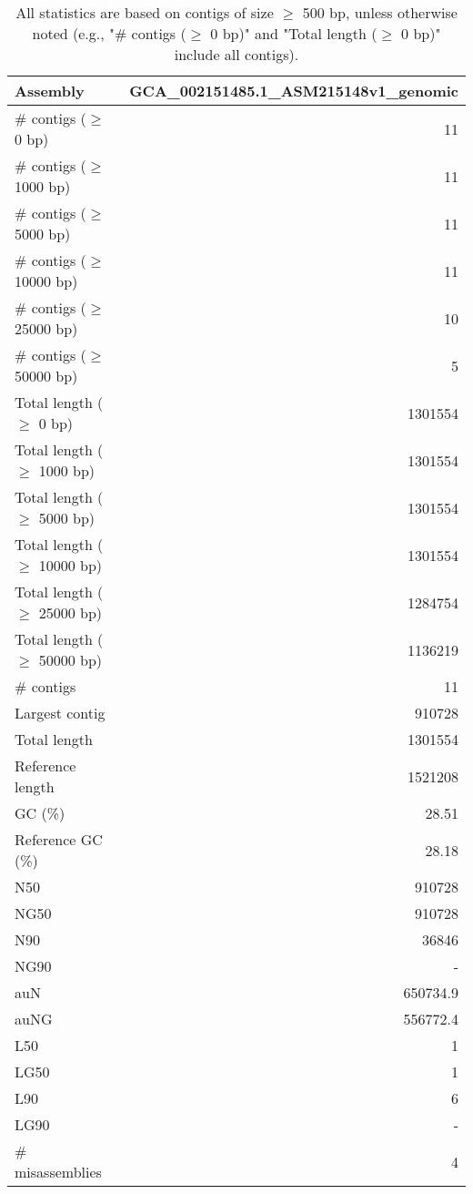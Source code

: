 \documentclass[12pt,a4paper]{article}
\begin{document}
\begin{table}[ht]
\begin{center}
\caption{All statistics are based on contigs of size $\geq$ 500 bp, unless otherwise noted (e.g., "\# contigs ($\geq$ 0 bp)" and "Total length ($\geq$ 0 bp)" include all contigs).}
\begin{tabular}{|l*{1}{|r}|}
\hline
Assembly & GCA\_002151485.1\_ASM215148v1\_genomic \\ \hline
\# contigs ($\geq$ 0 bp) & 11 \\ \hline
\# contigs ($\geq$ 1000 bp) & 11 \\ \hline
\# contigs ($\geq$ 5000 bp) & 11 \\ \hline
\# contigs ($\geq$ 10000 bp) & 11 \\ \hline
\# contigs ($\geq$ 25000 bp) & 10 \\ \hline
\# contigs ($\geq$ 50000 bp) & 5 \\ \hline
Total length ($\geq$ 0 bp) & 1301554 \\ \hline
Total length ($\geq$ 1000 bp) & 1301554 \\ \hline
Total length ($\geq$ 5000 bp) & 1301554 \\ \hline
Total length ($\geq$ 10000 bp) & 1301554 \\ \hline
Total length ($\geq$ 25000 bp) & 1284754 \\ \hline
Total length ($\geq$ 50000 bp) & 1136219 \\ \hline
\# contigs & 11 \\ \hline
Largest contig & 910728 \\ \hline
Total length & 1301554 \\ \hline
Reference length & 1521208 \\ \hline
GC (\%) & 28.51 \\ \hline
Reference GC (\%) & 28.18 \\ \hline
N50 & 910728 \\ \hline
NG50 & 910728 \\ \hline
N90 & 36846 \\ \hline
NG90 & - \\ \hline
auN & 650734.9 \\ \hline
auNG & 556772.4 \\ \hline
L50 & 1 \\ \hline
LG50 & 1 \\ \hline
L90 & 6 \\ \hline
LG90 & - \\ \hline
\# misassemblies & 4 \\ \hline

\end{tabular}
\end{center}
\end{table}
\end{document}
